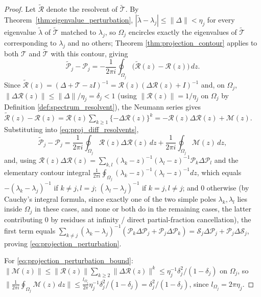 \begin{proof}
Let $\widetilde{\mathcal{R}}$ denote the resolvent of
$\widetilde{\mathcal{T}}$. By Theorem~\ref{thm:eigenvalue_perturbation},
$|\widetilde\lambda-\lambda_j|\leq\|\Delta\|<\eta_j$ for every eigenvalue
$\widetilde\lambda$ of $\widetilde{\mathcal{T}}$ matched to $\lambda_j$, so
$\Omega_j$ encircles exactly the eigenvalues of $\widetilde{\mathcal{T}}$
corresponding to $\lambda_j$ and no others; Theorem
\ref{thm:projection_contour} applies to both $\mathcal{T}$ and
$\widetilde{\mathcal{T}}$ with this contour, giving
\begin{equation}
\widetilde{\mathcal{P}}_j-\mathcal{P}_j = -\frac{1}{2\pi i}\oint_{\Omega_j}
\big(\widetilde{\mathcal{R}}(z)-\mathcal{R}(z)\big)\,dz.
\label{eq:proj_diff_resolvents}
\end{equation}
Since $\widetilde{\mathcal{R}}(z) = (\Delta+\mathcal{T}-zI)^{-1} =
\mathcal{R}(z)(\Delta\mathcal{R}(z)+I)^{-1}$ and, on $\Omega_j$,
$\|\Delta\mathcal{R}(z)\|\leq\|\Delta\|/\eta_j=\delta_j<1$ (using
$\|\mathcal{R}(z)\|=1/\eta_j$ on $\Omega_j$ by Definition
\ref{def:spectrum_resolvent}), the Neumann series gives $\widetilde{
\mathcal{R}}(z)-\mathcal{R}(z) = \mathcal{R}(z)\sum_{k\geq 1}\{-\Delta
\mathcal{R}(z)\}^k = -\mathcal{R}(z)\Delta\mathcal{R}(z)+\mathcal{M}(z)$.
Substituting into \eqref{eq:proj_diff_resolvents},
\[
\widetilde{\mathcal{P}}_j-\mathcal{P}_j = \frac{1}{2\pi i}\oint_{\Omega_j}
\mathcal{R}(z)\Delta\mathcal{R}(z)\,dz + \frac{1}{2\pi i}\oint_{\Omega_j}
\mathcal{M}(z)\,dz,
\]
and, using $\mathcal{R}(z)\Delta\mathcal{R}(z) = \sum_{k,l}(\lambda_k-z)^{-1}
(\lambda_l-z)^{-1}\mathcal{P}_k\Delta\mathcal{P}_l$ and the elementary
contour integral $\frac{1}{2\pi i}\oint_{\Omega_j}(\lambda_k-z)^{-1}
(\lambda_l-z)^{-1}dz$, which equals $-(\lambda_k-\lambda_j)^{-1}$ if
$k\neq j,l=j$; $(\lambda_l-\lambda_j)^{-1}$ if $k=j,l\neq j$; and $0$
otherwise (by Cauchy's integral formula, since exactly one of the two
simple poles $\lambda_k,\lambda_l$ lies inside $\Omega_j$ in these cases,
and none or both do in the remaining cases, the latter contributing $0$ by
residues at infinity / direct partial-fraction cancellation), the first
term equals $\sum_{k\neq j}(\lambda_k-\lambda_j)^{-1}(\mathcal{P}_k\Delta
\mathcal{P}_j+\mathcal{P}_j\Delta\mathcal{P}_k) = \mathcal{S}_j\Delta
\mathcal{P}_j+\mathcal{P}_j\Delta\mathcal{S}_j$, proving
\eqref{eq:projection_perturbation}.

For \eqref{eq:projection_perturbation_bound}: $\|\mathcal{M}(z)\| \leq
\|\mathcal{R}(z)\|\sum_{k\geq 2}\|\Delta\mathcal{R}(z)\|^k \leq
\eta_j^{-1}\delta_j^2/(1-\delta_j)$ on $\Omega_j$, so $\big\|\frac{1}{2\pi
i}\oint_{\Omega_j}\mathcal{M}(z)\,dz\big\| \leq \frac{l_{\Omega_j}}{2\pi}
\eta_j^{-1}\delta_j^2/(1-\delta_j) = \delta_j^2/(1-\delta_j)$, since
$l_{\Omega_j}=2\pi\eta_j$.


\end{proof}
